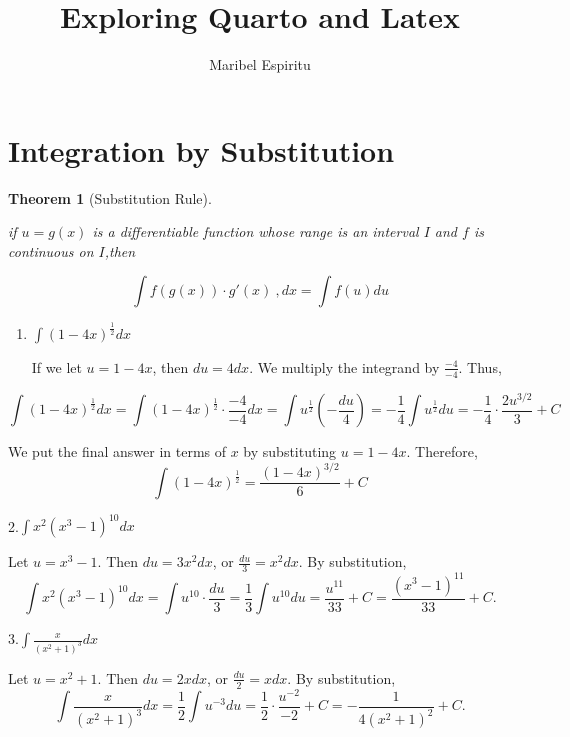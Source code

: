 \documentclass[
  letterpaper,
  DIV=11,
  numbers=noendperiod]{scrartcl}
\title{Exploring Quarto and Latex}
\author{Maribel Espiritu}
\date{}
\theoremstyle{plain}
\newtheorem{theorem}{Theorem}[section]
\theoremstyle{remark}
\begin{document}
\maketitle
\ifdefined\Shaded\renewenvironment{Shaded}{\begin{tcolorbox}[frame hidden, enhanced, borderline west={3pt}{0pt}{shadecolor}, boxrule=0pt, interior hidden, sharp corners, breakable]}{\end{tcolorbox}}\fi

\hypertarget{integration-by-substitution}{%
\section{Integration by
Substitution}\label{integration-by-substitution}}

\begin{theorem}[Substitution
Rule]\protect\hypertarget{thm-sub_rule}{}\label{thm-sub_rule}

if \(u=g(x)\) is a differentiable function whose range is an interval
\(I\) and \(f\) is continuous on \(I\),then

\[
\int f(g(x)) \cdot g'(x)\ ,dx = \int f(u) du
\]

\end{theorem}

\begin{enumerate}
\def\labelenumi{\arabic{enumi}.}
\item
  \(\int(1-4x)^\frac{1}{2}dx\)

  If we let \(u = 1-4x\), then \(du = 4dx\). We multiply the integrand
  by \(\frac{-4}{-4}\). Thus,
\end{enumerate}

\[
\int(1-4x)^\frac{1}{2}dx=\int(1-4x)^\frac{1}{2}\cdot\frac{-4}{-4}dx= \int u^\frac{1}{2}(-\frac{du}{4})= -\frac{1}{4}\int u^\frac{1}{2}du= -\frac{1}{4}\cdot\frac{2u^{3/2}}{3} + C
\]

We put the final answer in terms of \(x\) by substituting \(u=1-4x\).
Therefore, \[\int(1-4x)^\frac{1}{2}=\dfrac{(1-4x)^{3/2}}{6}+ C\]

2.\(\int x^2\left(x^3-1\right)^{10} dx\)

Let \(u=x^3-1\). Then \(du=3x^2dx\), or \(\frac{du}{3}=x^2 dx\). By
substitution, \[
\int x^2\left(x^3-1\right)^{10} dx = \int u^{10}\cdot \frac{du}{3}= \frac{1}{3}\int u^{10}du=\frac{u^{11}}{33} + C= \frac{\left(x^3-1\right)^{11}}{33}+ C.
\]

3.\(\int \frac{x}{\left(x^2+1\right)^3} dx\)

Let \(u=x^2+1\). Then \(du=2xdx\), or \(\frac{du}{2}=xdx\). By
substitution, \[
\int \frac{x}{\left(x^2+1\right)^3}dx=\frac{1}{2}\int u^{-3}du=\frac{1}{2}\cdot \frac{u^{-2}}{-2}+C=-\frac{1}{4\left(x^2+1\right)^2}+C.
\]
\end{document}
